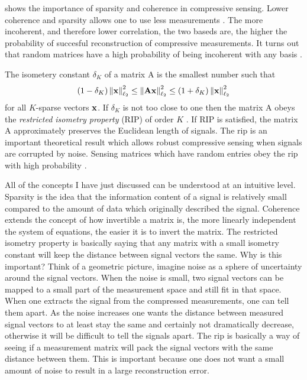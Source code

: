  shows the importance of sparsity and coherence in compressive sensing. Lower coherence and sparsity allows one to use less measurements \cite{duarte2008single}. The more incoherent, and therefore lower correlation, the two baseds are, the higher the probability of succesful reconstruction of compressive measurements. It turns out that random matrices have a high probability of being incoherent with any basis \cite{candes2008introduction}. 

The isometery constant $\delta_K$ of a matrix \gls{A} is the smallest number such that 
\begin{equation}
	\left( 1 - \delta_K \right) \left\| \mathbf{x} \right\|_{\ell_2}^{2} \leq \left\| \mathbf{A} \mathbf{x} \right\|_{\ell_2}^{2} \leq \left( 1 + \delta_K \right) \left\| \mathbf{x} \right\|_{\ell_2}^{2} 
\label{eq:rip}
\end{equation}
for all $K$-sparse vectors $\mathbf{x}$. If $\delta_K$ is not too close to one then the matrix \gls{A} obeys the \emph{restricted isometry property} (RIP) of order $K$ \cite{candes2008introduction}. If RIP is satisfied, the matrix \gls{A} approximately preserves the Euclidean length of signals. The \gls{rip} is an important theoretical result which allows robust compressive sensing when signals are corrupted by noise. Sensing matrices which have random entries obey the \gls{rip} with high probability \cite{candes2008introduction, duarte2008single, foucart2013mathematical}. 

All of the concepts I have just discussed can be understood at an intuitive level. Sparsity is the idea that the information content of a signal is relatively small compared to the amount of data which originally described the signal. Coherence extends the concept of how invertible a matrix is, the more linearly independent the system of equations, the easier it is to invert the matrix. The restricted isometry property is basically saying that any matrix with a small isometry constant will keep the distance between signal vectors the same. Why is this important? Think of a geometric picture, imagine noise as a sphere of uncertainty around the signal vectors. When the noise is small, two signal vectors can be mapped to a small part of the measurement space and still fit in that space. When one extracts the signal from the compressed measurements, one can tell them apart. As the noise increases one wants the distance between measured signal vectors to at least stay the same and certainly not dramatically decrease, otherwise it will be difficult to tell the signals apart. The \gls{rip} is basically a way of seeing if a measurement matrix will pack the signal vectors with the same distance between them. This is important because one does not want a small amount of noise to result in a large reconstruction error. 

